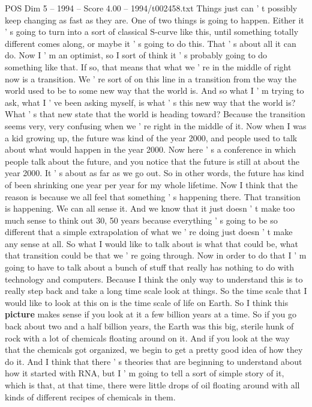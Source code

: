 \begin{textsample}{POS Dim 5 – 1994 – Score 4.00 – 1994/t002458.txt}
Things just can ' t possibly keep changing as fast as they are.
One of two things is going to happen.
Either it ' s going to turn into a sort of classical S-curve like this, until something totally different comes along, or maybe it ' s going to do this.
That ' s about all it can do.
Now I ' m an optimist, so I sort of think it ' s probably going to do something like that.
If so, that means that what we ' re in the middle of right now is a transition.
We ' re sort of on this line in a transition from the way the world used to be to some new way that the world is.
And so what I ' m trying to ask, what I ' ve been asking myself, is what ' s this new way that the world is?
What ' s that new state that the world is heading toward?
Because the transition seems very, very confusing when we ' re right in the middle of it.
Now when I was a kid growing up, the future was kind of the year 2000, and people used to talk about what would happen in the year 2000.
Now here ' s a conference in which people talk about the future, and you notice that the future is still at about the year 2000.
It ' s about as far as we go out.
So in other words, the future has kind of been shrinking one year per year for my whole lifetime.
Now I think that the reason is because we all feel that something ' s happening there.
That transition is happening.
We can all sense it.
And we know that it just doesn ' t make too much sense to think out 30, 50 years because everything ' s going to be so different that a simple extrapolation of what we ' re doing just doesn ' t make any sense at all.
So what I would like to talk about is what that could be, what that transition could be that we ' re going through.
Now in order to do that I ' m going to have to talk about a bunch of stuff that really has nothing to do with technology and computers.
Because I think the only way to understand this is to really step back and take a long time scale look at things.
So the time scale that I would like to look at this on is the time scale of life on Earth.
So I think this \textbf{picture} makes sense if you look at it a few billion years at a time.
So if you go back about two and a half billion years, the Earth was this big, sterile hunk of rock with a lot of chemicals floating around on it.
And if you look at the way that the chemicals got organized, we begin to get a pretty good idea of how they do it.
And I think that there ' s theories that are beginning to understand about how it started with RNA, but I ' m going to tell a sort of simple story of it, which is that, at that time, there were little drops of oil floating around with all kinds of different recipes of chemicals in them.

\end{textsample}
